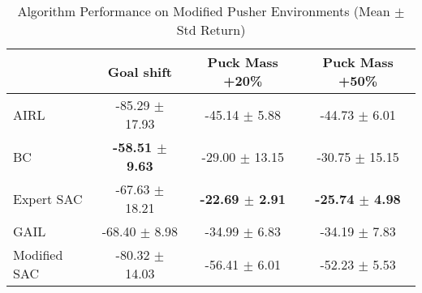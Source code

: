\documentclass{article}
\begin{document}
\pagestyle{empty}

\begin{table}
\caption{Algorithm Performance on Modified Pusher Environments (Mean $\pm$ Std Return)}
\label{tab:perf_mod_pusher}
\begin{adjustbox}{max width=\textwidth, center}
\begin{tabular}{lccc}
\toprule
 & Goal shift & Puck Mass +20\% & Puck Mass +50\% \\
\midrule
AIRL & -85.29 $\pm$ 17.93 & -45.14 $\pm$ 5.88 & -44.73 $\pm$ 6.01 \\
BC & \textbf{-58.51 $\pm$ 9.63} & -29.00 $\pm$ 13.15 & -30.75 $\pm$ 15.15 \\
Expert SAC & -67.63 $\pm$ 18.21 & \textbf{-22.69 $\pm$ 2.91} & \textbf{-25.74 $\pm$ 4.98} \\
GAIL & -68.40 $\pm$ 8.98 & -34.99 $\pm$ 6.83 & -34.19 $\pm$ 7.83 \\
Modified SAC & -80.32 $\pm$ 14.03 & -56.41 $\pm$ 6.01 & -52.23 $\pm$ 5.53 \\
\bottomrule
\end{tabular}
\end{adjustbox}
\end{table}
\end{document}
